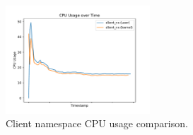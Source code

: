 \begin{figure}[!htb]
\begin{minipage}{0.48\textwidth}
    \end{minipage}\hfill
    \begin{minipage}{\textwidth}
        \centering
        \includegraphics[width=0.48\textwidth]{figures/04_testing_and_results/cpu_usage_client_ns.pdf}
        \caption[Client CPU usage comparison]{Client namespace CPU usage comparison.}\label{fig:cpu-utilization-client}
    \end{minipage}
\end{figure}


